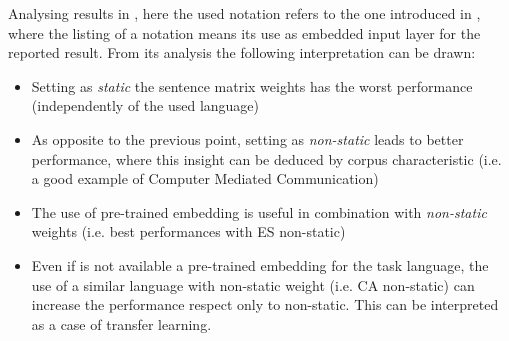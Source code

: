 Analysing results in , here the used notation refers to the one introduced in , where the listing of a notation means its use as embedded input layer for the reported result. From its analysis the following interpretation can be drawn:
\begin{itemize}
\item Setting as \emph{static} the sentence matrix weights has the worst performance (independently of the used language)
\item As opposite to the previous point, setting as \emph{non-static} leads to better performance, where this insight can be deduced by corpus characteristic (i.e. a good example of Computer Mediated Communication)
\item The use of pre-trained embedding is useful in combination with \emph{non-static} weights (i.e. best performances with ES non-static)
\item Even if is not available a pre-trained embedding for the task language, the use of a similar language with non-static weight (i.e. CA non-static) can increase the performance respect only to non-static. This can be interpreted as a case of transfer learning.
\end{itemize}

\begin{comment}
\begin{table}[h]
\footnotesize
\caption{Text representation study comparing 10-fold cross validation results over the development set in terms of percentuage of $F_{1-macro}$ score. The pre-processing setting was fixed at RM+EM.}
\centering
\begin{tabular}{l|ccccc}
\toprule
\multirow{2}{*}{Embedding}	& \multicolumn{5}{ c }{Models}       \\ 
					& CNN		& LSTM		& B-LSTM	& FAST-TEXT	& KIM	\\ 
\hline 
ES static			& \textbf{48,1}		& 36,1		& 38,9		& 36,4		& 43,6\\
CA static			& \textbf{45,1}		& 30,6		& 38,5		& 30,1		& 39,6\\ 
\hline
ES non-static		& \win57,1		& 52,1		& 49,9		& \win54,8		& \win\textbf{58,9}\\
CA non-static		& 53,5		& \win53,6		& 46,3		& 54,1		& \textbf{56,2}\\
\hline
non-static			& 52,6		& 47,3		& \win51,8		& 53,3		& \textbf{54,7}\\
\bottomrule
\end{tabular}
\end{table}
\end{comment}

